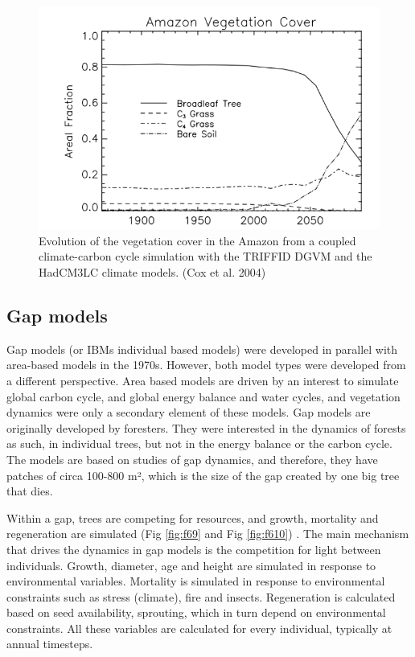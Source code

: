 \documentclass[12pt,oneside]{book}
\begin{document}
\begin{figure}

{\centering \includegraphics[width=0.8\linewidth]{figures/chap6/f68_amazon_dieback} 

}

\caption{Evolution of the vegetation cover in the Amazon from a coupled climate-carbon cycle simulation with the TRIFFID DGVM and the HadCM3LC climate models. (Cox et al. 2004)}\label{fig:f68}
\end{figure}

\subsection{Gap models}\label{gap-models}

Gap models (or IBMs individual based models) were developed in parallel
with area-based models in the 1970s. However, both model types were
developed from a different perspective. Area based models are driven by
an interest to simulate global carbon cycle, and global energy balance
and water cycles, and vegetation dynamics were only a secondary element
of these models. Gap models are originally developed by foresters. They
were interested in the dynamics of forests as such, in individual trees,
but not in the energy balance or the carbon cycle. The models are based
on studies of gap dynamics, and therefore, they have patches of circa
100-800 m², which is the size of the gap created by one big tree that
dies.

Within a gap, trees are competing for resources, and growth, mortality
and regeneration are simulated (Fig \ref{fig:f69} and Fig
\ref{fig:f610}) . The main mechanism that drives the dynamics in gap
models is the competition for light between individuals. Growth,
diameter, age and height are simulated in response to environmental
variables. Mortality is simulated in response to environmental
constraints such as stress (climate), fire and insects. Regeneration is
calculated based on seed availability, sprouting, which in turn depend
on environmental constraints. All these variables are calculated for
every individual, typically at annual timesteps.
\end{document}
